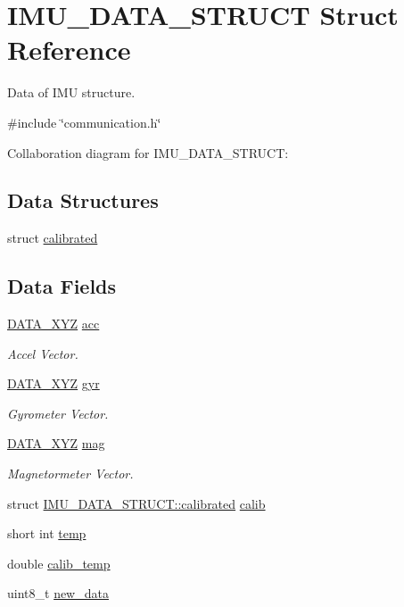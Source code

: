 \hypertarget{structIMU__DATA__STRUCT}{
\section{IMU\_\-DATA\_\-STRUCT Struct Reference}
\label{structIMU__DATA__STRUCT}
}


Data of IMU structure.  




{\ttfamily \#include \char`\"{}communication.h\char`\"{}}



Collaboration diagram for IMU\_\-DATA\_\-STRUCT:\subsection*{Data Structures}
\begin{DoxyCompactItemize}
\item 
struct \hyperlink{structIMU__DATA__STRUCT_1_1calibrated}{calibrated}
\end{DoxyCompactItemize}
\subsection*{Data Fields}
\begin{DoxyCompactItemize}
\item 
\hyperlink{structDATA__XYZ}{DATA\_\-XYZ} \hyperlink{structIMU__DATA__STRUCT_a448f284bf44eb503affda586ad5fa9d2}{acc}
\begin{DoxyCompactList}\small\item\em Accel Vector. \item\end{DoxyCompactList}\item 
\hyperlink{structDATA__XYZ}{DATA\_\-XYZ} \hyperlink{structIMU__DATA__STRUCT_a0c1ac26626e4434a2ee124a1928a23a1}{gyr}
\begin{DoxyCompactList}\small\item\em Gyrometer Vector. \item\end{DoxyCompactList}\item 
\hyperlink{structDATA__XYZ}{DATA\_\-XYZ} \hyperlink{structIMU__DATA__STRUCT_a40c7df8b6d49297aa52873cfd9b60daa}{mag}
\begin{DoxyCompactList}\small\item\em Magnetormeter Vector. \item\end{DoxyCompactList}\item 
struct \hyperlink{structIMU__DATA__STRUCT_1_1calibrated}{IMU\_\-DATA\_\-STRUCT::calibrated} \hyperlink{structIMU__DATA__STRUCT_aeffe3c3c5a7191a5cef16e7aab6c3795}{calib}
\item 
short int \hyperlink{structIMU__DATA__STRUCT_a81e1dbf765c1d947ca6076aa1bbc73e7}{temp}
\item 
double \hyperlink{structIMU__DATA__STRUCT_a3553fcee6beba17fe0c7711ac0483875}{calib\_\-temp}
\item 
uint8\_\-t \hyperlink{structIMU__DATA__STRUCT_a99924252176326418863e511d4fa437b}{new\_\-data}
\end{DoxyCompactItemize}


